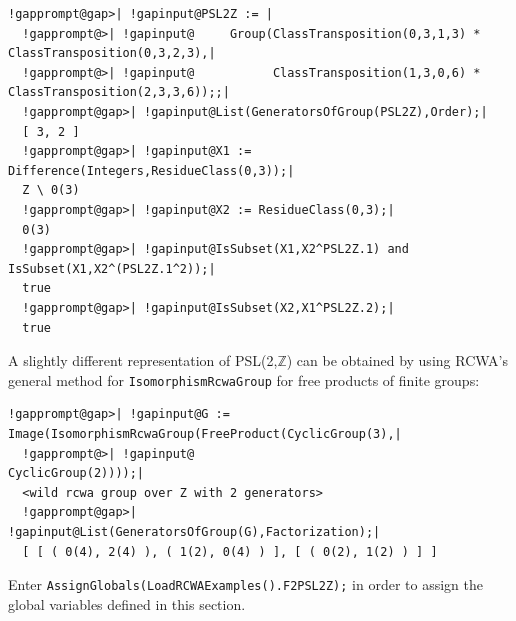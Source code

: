 \documentclass[a4paper,11pt]{report}
\begin{document}
{{\begin{Verbatim}[commandchars=!@|,fontsize=\small,frame=single,label=Example]
  !gapprompt@gap>| !gapinput@PSL2Z := |
  !gapprompt@>| !gapinput@     Group(ClassTransposition(0,3,1,3) * ClassTransposition(0,3,2,3),|
  !gapprompt@>| !gapinput@           ClassTransposition(1,3,0,6) * ClassTransposition(2,3,3,6));;|
  !gapprompt@gap>| !gapinput@List(GeneratorsOfGroup(PSL2Z),Order);|
  [ 3, 2 ]
  !gapprompt@gap>| !gapinput@X1 := Difference(Integers,ResidueClass(0,3));|
  Z \ 0(3)
  !gapprompt@gap>| !gapinput@X2 := ResidueClass(0,3);|
  0(3)
  !gapprompt@gap>| !gapinput@IsSubset(X1,X2^PSL2Z.1) and IsSubset(X1,X2^(PSL2Z.1^2));|
  true
  !gapprompt@gap>| !gapinput@IsSubset(X2,X1^PSL2Z.2);|
  true
\end{Verbatim}
 A slightly different representation of PSL(2,{\ensuremath{\mathbb Z}}) can be
obtained by using \textsf{RCWA}'s general method for \texttt{IsomorphismRcwaGroup} for free products of finite groups: 
\begin{Verbatim}[commandchars=!@|,fontsize=\small,frame=single,label=Example]
  !gapprompt@gap>| !gapinput@G := Image(IsomorphismRcwaGroup(FreeProduct(CyclicGroup(3),|
  !gapprompt@>| !gapinput@                                               CyclicGroup(2))));|
  <wild rcwa group over Z with 2 generators>
  !gapprompt@gap>| !gapinput@List(GeneratorsOfGroup(G),Factorization);|
  [ [ ( 0(4), 2(4) ), ( 1(2), 0(4) ) ], [ ( 0(2), 1(2) ) ] ]
\end{Verbatim}
 Enter \texttt{AssignGlobals(LoadRCWAExamples().F2{\textunderscore}PSL2Z);} in order to assign the global variables defined in this section.  }

  }

       
\end{document}
